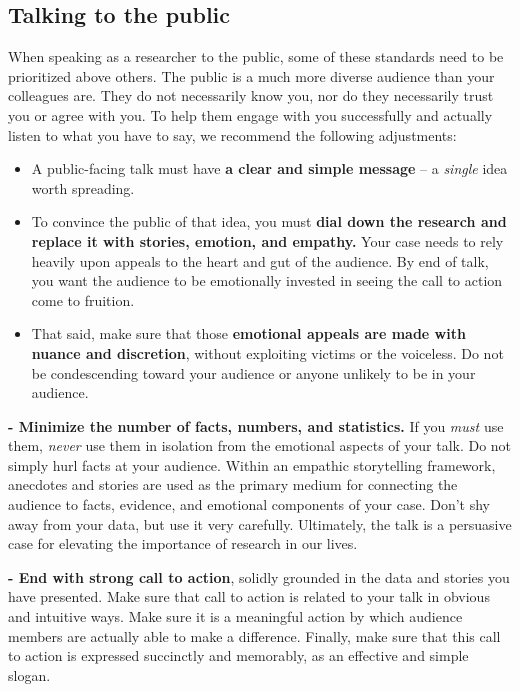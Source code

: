 \documentclass[
]{book}
\begin{document}
\hypertarget{talking-to-the-public}{%
\subsection*{Talking to the public}\label{talking-to-the-public}}

When speaking as a researcher to the public, some of these standards need to be prioritized above others. The public is a much more diverse audience than your colleagues are. They do not necessarily know you, nor do they necessarily trust you or agree with you. To help them engage with you successfully and actually listen to what you have to say, we recommend the following adjustments:

\begin{itemize}
\item
  A public-facing talk must have \textbf{a clear and simple message} -- a \emph{single} idea worth spreading.
\item
  To convince the public of that idea, you must \textbf{dial down the research and replace it with stories, emotion, and empathy.} Your case needs to rely heavily upon appeals to the heart and gut of the audience. By end of talk, you want the audience to be emotionally invested in seeing the call to action come to fruition.
\item
  That said, make sure that those \textbf{emotional appeals are made with nuance and discretion}, without exploiting victims or the voiceless. Do not be condescending toward your audience or anyone unlikely to be in your audience.
\end{itemize}

\textbf{- Minimize the number of facts, numbers, and statistics.} If you \emph{must} use them, \emph{never} use them in isolation from the emotional aspects of your talk. Do not simply hurl facts at your audience. Within an empathic storytelling framework, anecdotes and stories are used as the primary medium for connecting the audience to facts, evidence, and emotional components of your case. Don't shy away from your data, but use it very carefully. Ultimately, the talk is a persuasive case for elevating the importance of research in our lives.

\textbf{- End with strong call to action}, solidly grounded in the data and stories you have presented. Make sure that call to action is related to your talk in obvious and intuitive ways. Make sure it is a meaningful action by which audience members are actually able to make a difference. Finally, make sure that this call to action is expressed succinctly and memorably, as an effective and simple slogan.
\end{document}
